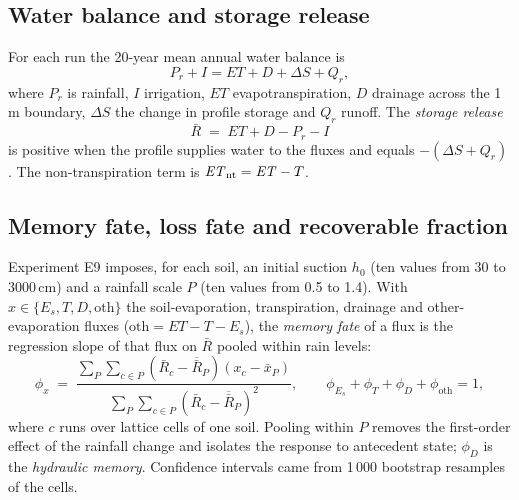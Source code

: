 \documentclass[review,12pt,authoryear]{elsarticle}
\begin{document}
\subsection{Water balance and storage release}
For each run the 20-year mean annual water balance is
\begin{equation}
P_r + I = \mathit{ET} + D + \Delta S + Q_r,
\label{eq:wb}
\end{equation}
where $P_r$ is rainfall, $I$ irrigation, $\mathit{ET}$ evapotranspiration, $D$ drainage across the 1\,m boundary, $\Delta S$ the change in profile storage and $Q_r$ runoff. The \emph{storage release}
\begin{equation}
\bar R \;=\; \mathit{ET}+D-P_r-I
\label{eq:release}
\end{equation}
is positive when the profile supplies water to the fluxes and equals $-(\Delta S+Q_r)$. The non-transpiration term is $\mathit{ET}_{\mathrm{nt}}=\mathit{ET}-T$.

\subsection{Memory fate, loss fate and recoverable fraction}
Experiment E9 imposes, for each soil, an initial suction $h_0$ (ten values from 30 to 3000\,cm) and a rainfall scale $P$ (ten values from 0.5 to 1.4). With $x\in\{E_s,T,D,\text{oth}\}$ the soil-evaporation, transpiration, drainage and other-evaporation fluxes ($\text{oth}=\mathit{ET}-T-E_s$), the \emph{memory fate} of a flux is the regression slope of that flux on $\bar R$ pooled within rain levels:
\begin{equation}
\phi_x \;=\; \frac{\sum_{P}\sum_{c\in P}(\bar R_c-\overline{\bar R}_P)(x_c-\bar x_P)}{\sum_{P}\sum_{c\in P}(\bar R_c-\overline{\bar R}_P)^2},\qquad \phi_{E_s}+\phi_T+\phi_D+\phi_{\mathrm{oth}}=1 ,
\label{eq:phi}
\end{equation}
where $c$ runs over lattice cells of one soil. Pooling within $P$ removes the first-order effect of the rainfall change and isolates the response to antecedent state; $\phi_D$ is the \emph{hydraulic memory}. Confidence intervals came from 1\,000 bootstrap resamples of the cells.
\end{document}
